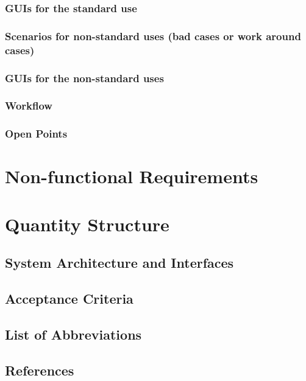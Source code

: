 \documentclass[12pt]{article}
\theoremstyle{definition}
\begin{document}
\pagebreak
\subsubsection{GUIs for the standard use}

\pagebreak
\subsubsection{Scenarios for non-standard uses (bad cases or work around cases)}

\pagebreak
\subsubsection{GUIs for the non-standard uses}

\pagebreak
\subsubsection{Workflow}

\pagebreak
\subsubsection{Open Points}
\pagebreak
\section{Non-functional Requirements}
\pagebreak
\section{Quantity Structure}
\pagebreak
\subsection{System Architecture and Interfaces}
\pagebreak
\subsection{Acceptance Criteria}
\pagebreak
\subsection{List of Abbreviations}
\pagebreak
\subsection{References}
\end{document}
